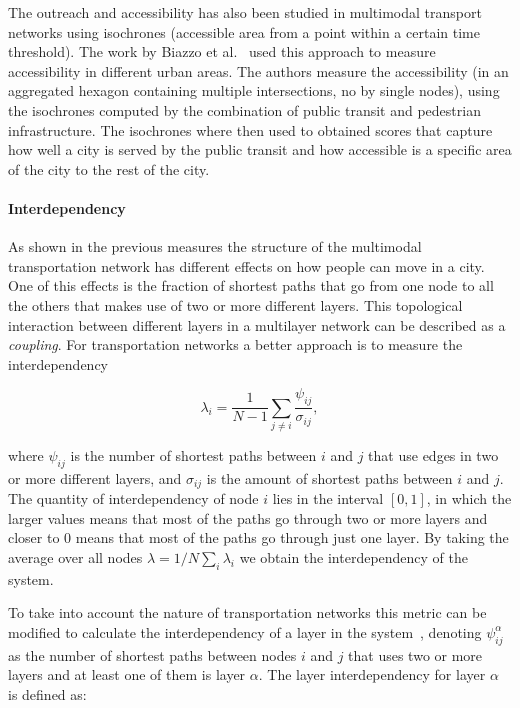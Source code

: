 The outreach and accessibility has also been studied in multimodal transport networks using isochrones (accessible area from a point within a certain time threshold). The work by Biazzo et al.~\cite{biazzo2019accesibility} used this approach to measure accessibility in different urban areas. The authors measure the accessibility (in an aggregated hexagon containing multiple intersections, no by single nodes), using the isochrones computed by the combination of public transit and pedestrian infrastructure. The isochrones where then used to obtained scores that capture how well a city is served by the public transit and how accessible is a specific area of the city to the rest of the city.

\paragraph*{Interdependency} \label{interdependence}
As shown in the previous measures the structure of the multimodal transportation network has different effects on how people can move in a city. One of this effects is the fraction of shortest paths that go from one node to all the others that makes use of two or more different layers. This topological interaction between different layers in a multilayer network can be described as a \textit{coupling}. For transportation networks a better approach is to measure the interdependency~\cite{morris2012transport,nicosia2013growing,strano2015features}

\begin{equation}
    \lambda_i=\frac{1}{N-1}\sum_{j\neq i}\frac{\psi_{ij}}{\sigma_{ij}},
    \label{eq:coupling}
\end{equation}

where $\psi_{ij}$ is the number of shortest paths between $i$ and $j$ that use edges in two or more different layers, and $\sigma_{ij}$ is the amount of shortest paths between $i$ and $j$. The quantity of interdependency of node $i$ lies in the interval $[0, 1]$, in which the larger values means that most of the paths go through two or more layers and closer to $0$ means that most of the paths go through just one layer. By taking the average over all nodes $\lambda = 1/N \sum_i\lambda_i$ we obtain the interdependency of the system. 

To take into account the nature of transportation networks this metric can be modified to calculate the interdependency of a layer in the system~\cite{Aleta2017Multilayer}, denoting $\psi_{ij}^\alpha$ as the number of shortest paths between nodes $i$ and $j$ that uses two or more layers and at least one of them is layer $\alpha$. The layer interdependency for layer $\alpha$ is defined as:

